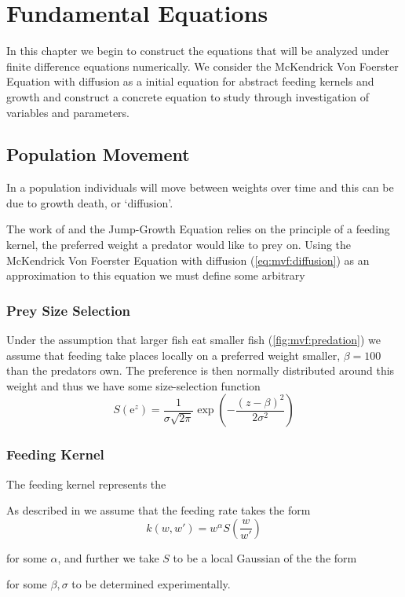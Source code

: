\documentclass[../main.tex]{subfiles}
\begin{document}
  \chapter{Fundamental Equations}\label{chapter:equations}

  In this chapter we begin to construct the equations that will be analyzed under finite difference equations numerically. We consider the McKendrick Von Foerster Equation with diffusion as a initial equation for abstract feeding kernels and growth and construct a concrete equation to study through investigation of variables and parameters.

  \section{Population Movement}
  In a population individuals will move between weights over time and this can be due to growth death, or `diffusion'.  

  The work of \cite{datta2010} and the Jump-Growth Equation relies on the principle of a feeding kernel, the preferred weight a predator would like to prey on. Using the McKendrick Von Foerster Equation with diffusion (\autoref{eq:mvf:diffusion}) as an approximation to this equation we must define some arbitrary

  \subsection{Prey Size Selection}
  Under the assumption that larger fish eat smaller fish (\autoref{fig:mvf:predation}) we assume that feeding take places locally on a preferred weight smaller, $\beta = 100$ than the predators own. The preference is then normally distributed around this weight and thus we have some size-selection function
  \begin{equation}\label{eq:mvf:feedgaussian}
    S\left( \mathrm{e}^z \right) = \frac{1}{\sigma \sqrt{2\pi}} \exp{\left( - \frac{(z - \beta)^2}{2 \sigma^2}\right)}
  \end{equation}

  \subsection{Feeding Kernel}
  The feeding kernel represents the

  As described in \cite{benoit2004} we assume that the feeding rate takes the form
  \begin{equation}\label{eq:mvf:feeding}
    k(w, w') = w^{\alpha} S\left( \frac{w}{w'} \right)
  \end{equation}

  for some $\alpha$, and further we take $S$ to be a local Gaussian of the the form


  for some $\beta, \sigma$ to be determined experimentally.
\end{document}
